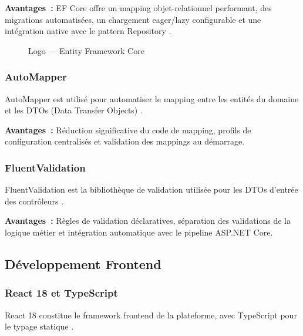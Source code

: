 \textbf{Avantages~:} EF Core offre un mapping objet-relationnel performant, des migrations
automatisées, un chargement eager/lazy configurable et une intégration native avec le
pattern Repository \cite{Npgsql}.

\begin{figure}[H]
    \centering
    \caption{Logo --- Entity Framework Core}
    \label{fig:logo_efcore}
\end{figure}

\subsubsection{AutoMapper}

\noindent AutoMapper est utilisé pour automatiser le mapping entre les entités du domaine
et les DTOs (Data Transfer Objects) \cite{AutoMapper}.

\textbf{Avantages~:} Réduction significative du code de mapping, profils de configuration
centralisés et validation des mappings au démarrage.

\subsubsection{FluentValidation}

\noindent FluentValidation est la bibliothèque de validation utilisée pour les DTOs
d'entrée des contrôleurs \cite{FluentValidation}.

\textbf{Avantages~:} Règles de validation déclaratives, séparation des validations de la
logique métier et intégration automatique avec le pipeline ASP.NET Core.

\subsection{Développement Frontend}

\subsubsection{React 18 et TypeScript}

\noindent React 18 constitue le framework frontend de la plateforme, avec TypeScript pour
le typage statique \cite{React}\cite{TypeScript}.

